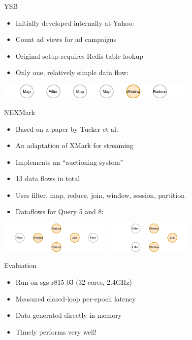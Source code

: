 \documentclass[14pt,t]{beamer}
\renewcommand{\title}[1]{
  {\huge #1} \vskip 0.4cm
}
\begin{document}
\begin{frame}
  \title{YSB}
  \begin{itemize}
  \item Initially developed internally at Yahoo:
  \item Count ad views for ad campaigns
  \item Original setup requires Redis table lookup
  \item Only one, relatively simple data flow:
  \end{itemize}
  \includegraphics[height=0.75cm]{ysb.png}
\end{frame}

\begin{frame}
  \title{NEXMark}
  \begin{itemize}
  \item Based on a paper by Tucker et al.
  \item An adaptation of XMark for streaming
  \item Implements an ``auctioning system''
  \item 13 data flows in total
  \item Uses filter, map, reduce, join, window, session, partition
  \item Dataflows for Query 5 and 8:
  \end{itemize}
  \includegraphics[height=1.5cm]{nex-5.png}
  \hfill
  \includegraphics[height=1.5cm]{nex-8.png}
\end{frame}

\begin{frame}
  \title{Evaluation}
  \begin{itemize}
  \item Run on sgs-r815-03 (32 cores, 2.4GHz)
  \item Measured closed-loop per-epoch latency
  \item Data generated directly in memory
  \item Timely performs very well!
  \end{itemize}
\end{frame}
\end{document}

